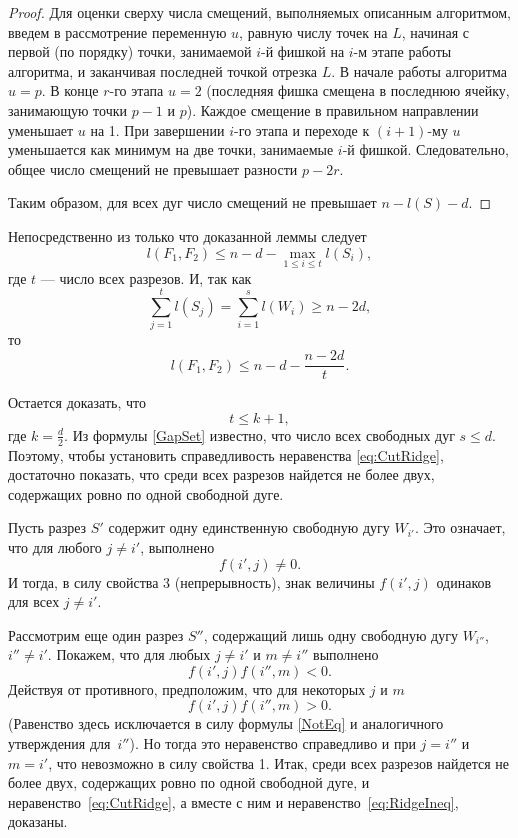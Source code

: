 \begin{proof}
Для оценки сверху числа смещений, выполняемых описанным алгоритмом, введем в рассмотрение переменную $u$, равную числу точек на $L$, начиная с первой (по порядку) точки, занимаемой $i$-й фишкой на $i$-м этапе работы алгоритма, и заканчивая последней точкой отрезка $L$. В начале работы алгоритма $u = p$. В конце $r$-го этапа $u=2$ (последняя фишка смещена в последнюю ячейку, занимающую точки $p-1$ и $p$). Каждое смещение в правильном направлении уменьшает $u$ на 1. При завершении $i$-го этапа и переходе к $(i+1)$-му $u$ уменьшается как минимум на две точки, занимаемые $i$-й фишкой.
Следовательно, общее число смещений не превышает разности $p - 2r$. 

Таким образом, для всех дуг число смещений не превышает $n - l(S) - d$.
\end{proof}


Непосредственно из только что доказанной леммы следует
$$
l(F_1,F_2)\le n-d - \max_{1\le i\le t} l(S_i),
$$
где $t$ --- число всех разрезов.
И, так как 
$$
\sum^{t}_{j=1} l(S_j)=\sum^{s}_{i=1} l(W_i)\ge n-2d,
$$
то
$$
l(F_1,F_2)\le n-d - \frac{n-2d}{t}. 
$$

Остается доказать, что 
\begin{equation}
\label{eq:CutRidge}
t\le k+1,
\end{equation}
где $k=\frac d2$.
Из формулы \eqref{GapSet} известно, что число всех свободных дуг $s\le d$.
Поэтому, чтобы установить справедливость неравенства \eqref{eq:CutRidge}, достаточно показать, 
что среди всех разрезов найдется не более двух, содержащих ровно по одной свободной дуге.

Пусть разрез $S'$ содержит одну единственную свободную дугу $W_{i'}$. 
Это означает, что для любого $j\ne i'$, выполнено
\begin{equation}
\label{NotEq}
f(i',j)\ne 0.
\end{equation}
И тогда, в силу свойства 3 (непрерывность), знак величины $f(i',j)$ одинаков для всех $j\ne i'$.

Рассмотрим еще один разрез $S''$, содержащий лишь одну свободную дугу $W_{i''}$, $i''\ne i'$.
Покажем, что для любых $j\ne i'$ и $m\ne i''$ выполнено
$$
f(i',j) f(i'',m) < 0.
$$
Действуя от противного, предположим, что для некоторых $j$ и $m$
$$
f(i',j) f(i'',m) > 0.
$$
(Равенство здесь исключается в силу формулы \eqref{NotEq} 
и аналогичного утверждения для~$i''$). 
Но тогда это неравенство справедливо и при $j=i''$ и $m=i'$,
что невозможно в силу свойства 1. 
Итак, среди всех разрезов найдется не более двух, содержащих ровно по одной свободной дуге,
и неравенство~\eqref{eq:CutRidge}, а вместе с ним и неравенство~\eqref{eq:RidgeIneq}, доказаны. 



